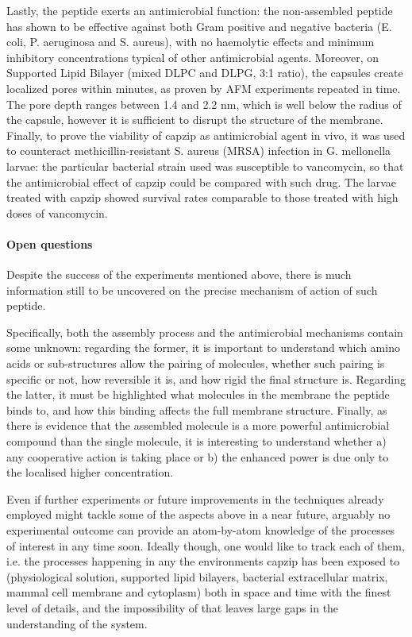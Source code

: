 Lastly, the peptide exerts an antimicrobial function: the non-assembled peptide has shown to be effective against both Gram positive and negative bacteria (E. coli, P. aeruginosa and S. aureus), with no haemolytic effects and minimum inhibitory concentrations typical of other antimicrobial agents.
%
Moreover, on Supported Lipid Bilayer (mixed DLPC and DLPG, 3:1 ratio), the capsules create localized pores within minutes, as proven by AFM experiments repeated in time. The pore depth ranges between 1.4 and 2.2 nm, which is well below the radius of the capsule, however it is sufficient to disrupt the structure of the membrane.
%
Finally, to prove the viability of capzip as antimicrobial agent in vivo, it was used to counteract methicillin-resistant S. aureus (MRSA) infection in G. mellonella larvae: the particular bacterial strain used was susceptible to vancomycin, so that the antimicrobial effect of capzip could be compared with such drug. The larvae treated with capzip showed survival rates comparable to those treated with high doses of vancomycin.


\paragraph{Open questions} Despite the success of the experiments mentioned above, there is much information still to be uncovered on the precise mechanism of action of such peptide. 

Specifically, both the assembly process and the antimicrobial mechanisms contain some unknown: regarding the former, it is important to understand which amino acids or sub-structures allow the pairing of molecules, whether such pairing is specific or not, how reversible it is, and how rigid the final structure is.
%
Regarding the latter, it must be highlighted what molecules in the membrane the peptide binds to, and how this binding affects the full membrane structure. Finally, as there is evidence that the assembled molecule is a more powerful antimicrobial compound than the single molecule, it is interesting to understand whether a) any cooperative action is taking place or b) the enhanced power is due only to the localised higher concentration.

Even if further experiments or future improvements in the techniques already employed might tackle some of the aspects above in a near future, arguably no experimental outcome can provide an atom-by-atom knowledge of the processes of interest in any time soon. Ideally though, one would like to track each of them, i.e. the processes happening in any the environments capzip has been exposed to (physiological solution, supported lipid bilayers, bacterial extracellular matrix, mammal cell membrane and cytoplasm) both in space and time with the finest level of details, and the impossibility of that leaves large gaps in the understanding of the system.


